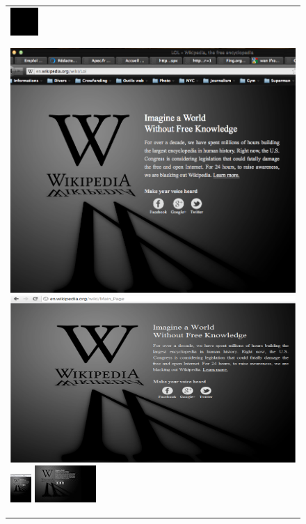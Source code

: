 \begin{figure}
\begin{tabular}{p{\textwidth}}
\begin{thumbsequence}
		\includegraphics[height=\thumbheight]{sopa/looseduplicate8.jpg}
	\end{thumbsequence}
	\newstrip
	\begin{thumbsequence}
		\includegraphics[height=\thumbheight]{sopa/looseduplicate9.png}
		\includegraphics[height=\thumbheight]{sopa/looseduplicate10.png}
		\includegraphics[height=\thumbheight]{sopa/looseduplicate11.jpg}
		\includegraphics[height=\thumbheight]{sopa/looseduplicate12.jpg}

\end{thumbsequence}
\end{tabular}
\end{figure}
